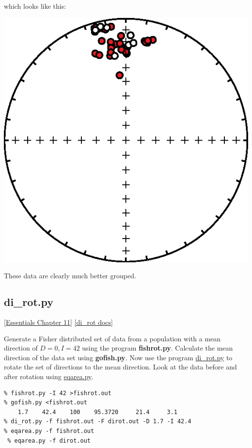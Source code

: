 \documentclass[11pt]{book}
\begin{document}
{{\noindent which looks like this:

  \includegraphics[width=12 cm]{EPSfiles/di_geo_geo_eq.eps}

  \noindent These data are clearly much better grouped.



\subsection{di\_rot.py}
\href{http://earthref.org/MAGIC/books/Tauxe/Essentials/WebBook3ch11.html#ch11}{[Essentials Chapter  11]}
\href{https://github.com/PmagPy/PmagPy/blob/master/programs/di_rot.py}{[di\_rot docs]}


Generate a Fisher distributed set of data from a population with a mean direction of $D=0, I=42$ using the program {\bf fishrot.py}.  Calculate the mean direction of the data set using {\bf gofish.py}.  Now use the program \href{#di_rot.py}{di\_rot.py} to rotate the set of directions to the mean direction.  Look at the data before and after rotation using \href{#eqarea.py}{eqarea.py}.

\begin{verbatim}
% fishrot.py -I 42 >fishrot.out
% gofish.py <fishrot.out
    1.7    42.4    100    95.3720     21.4     3.1
% di_rot.py -f fishrot.out -F dirot.out -D 1.7 -I 42.4
% eqarea.py -f fishrot.out
 % eqarea.py -f dirot.out
\end{verbatim}

}}
\end{document}
